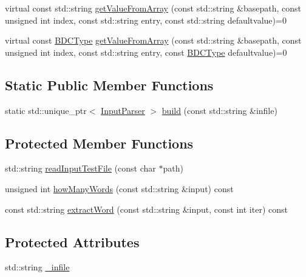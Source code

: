 \begin{DoxyCompactItemize}
\item 
virtual const std\+::string \mbox{\hyperlink{classfemus_1_1_input_parser_a08f0f52e28b4e9dfc5dcf7c1ba267938}{get\+Value\+From\+Array}} (const std\+::string \&basepath, const unsigned int index, const std\+::string entry, const std\+::string defaultvalue)=0
\item 
virtual const \mbox{\hyperlink{_b_d_c_type_enum_8hpp_ac1efcf28f6f152fe5354b888f616668d}{B\+D\+C\+Type}} \mbox{\hyperlink{classfemus_1_1_input_parser_a30b8407afe22e7ff56b67766cef51929}{get\+Value\+From\+Array}} (const std\+::string \&basepath, const unsigned int index, const std\+::string entry, const \mbox{\hyperlink{_b_d_c_type_enum_8hpp_ac1efcf28f6f152fe5354b888f616668d}{B\+D\+C\+Type}} defaultvalue)=0
\end{DoxyCompactItemize}
\subsection*{Static Public Member Functions}
\begin{DoxyCompactItemize}
\item 
static std\+::unique\+\_\+ptr$<$ \mbox{\hyperlink{classfemus_1_1_input_parser}{Input\+Parser}} $>$ \mbox{\hyperlink{classfemus_1_1_input_parser_af074bd4cfd9b026191f9ffe3c2ce7f54}{build}} (const std\+::string \&infile)
\end{DoxyCompactItemize}
\subsection*{Protected Member Functions}
\begin{DoxyCompactItemize}
\item 
std\+::string \mbox{\hyperlink{classfemus_1_1_input_parser_a7a8a5a9f57e14dd7669e53d14588f12a}{read\+Input\+Test\+File}} (const char $\ast$path)
\item 
unsigned int \mbox{\hyperlink{classfemus_1_1_input_parser_a9e790b63c7b8f1bbcb07097d144fbd9e}{how\+Many\+Words}} (const std\+::string \&input) const
\item 
const std\+::string \mbox{\hyperlink{classfemus_1_1_input_parser_af7cbe7caf86b9ec61d30fee4ca26b0f7}{extract\+Word}} (const std\+::string \&input, const int iter) const
\end{DoxyCompactItemize}
\subsection*{Protected Attributes}
\begin{DoxyCompactItemize}
\item 
std\+::string \mbox{\hyperlink{classfemus_1_1_input_parser_aa20f2d4c97be18875f4ed70dca4e0881}{\+\_\+infile}}
\end{DoxyCompactItemize}


